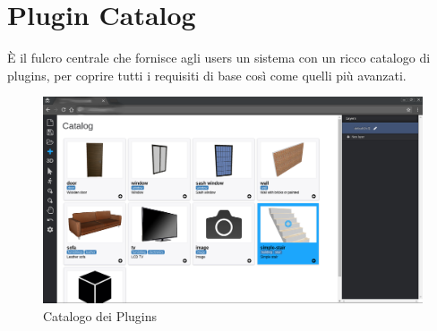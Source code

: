 \section{Plugin Catalog}
\label{sec:chapter_3_section_4}

\noindent
\`E il fulcro centrale che fornisce agli users un sistema con un ricco catalogo di plugins,
per coprire tutti i requisiti di base così come quelli più avanzati.


\begin{figure}[htbp] %
   \centering
   \includegraphics[width=1\linewidth]{images/figcatalog}
   \caption{Catalogo dei Plugins}
   \label{fig:catalog}
\end{figure}
